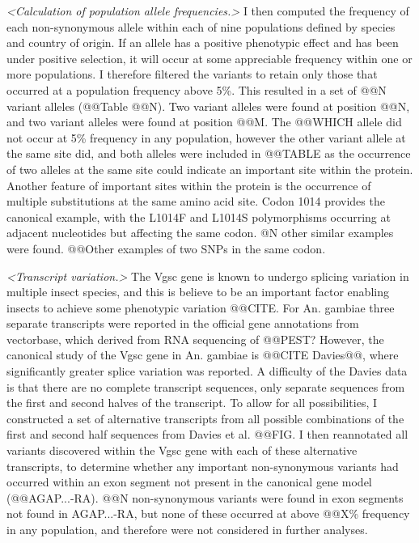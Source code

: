 \documentclass[a4paper,11pt,abstracton,hidelinks]{scrartcl}
\begin{document}
\textit{<Calculation of population allele frequencies.>}
%
I then computed the frequency of each non-synonymous allele within each of nine populations defined by species and country of origin.
%
If an allele has a positive phenotypic effect and has been under positive selection, it will occur at some appreciable frequency within one or more populations.
%
I therefore filtered the variants to retain only those that occurred at a population frequency above 5\%.
%
This resulted in a set of @@N variant alleles (@@Table @@N).
%
Two variant alleles were found at position @@N, and two variant alleles were found at position @@M.
%
The @@WHICH allele did not occur at 5\% frequency in any population, however the other variant allele at the same site did, and both alleles were included in @@TABLE as the occurrence of two alleles at the same site could indicate an important site within the protein.
%
Another feature of important sites within the protein is the occurrence of multiple substitutions at the same amino acid site.
%
Codon 1014 provides the canonical example, with the L1014F and L1014S polymorphisms occurring at adjacent nucleotides but affecting the same codon.
%
@N other similar examples were found.
%
@@Other examples of two SNPs in the same codon.


\textit{<Transcript variation.>}
%
The Vgsc gene is known to undergo splicing variation in multiple insect species, and this is believe to be an important factor enabling insects to achieve some phenotypic variation @@CITE.
%
For An. gambiae three separate transcripts were reported in the official gene annotations from vectorbase, which derived from RNA sequencing of @@PEST?
%
However, the canonical study of the Vgsc gene in An. gambiae is @@CITE Davies@@, where significantly greater splice variation was reported.
%
A difficulty of the Davies data is that there are no complete transcript sequences, only separate sequences from the first and second halves of the transcript.
%
To allow for all possibilities, I constructed a set of alternative transcripts from all possible combinations of the first and second half sequences from Davies et al. @@FIG.
%
I then reannotated all variants discovered within the Vgsc gene with each of these alternative transcripts, to determine whether any important non-synonymous variants had occurred within an exon segment not present in the canonical gene model (@@AGAP...-RA).
%
@@N non-synonymous variants were found in exon segments not found in AGAP...-RA, but none of these occurred at above @@X\% frequency in any population, and therefore were not considered in further analyses.
\end{document}
